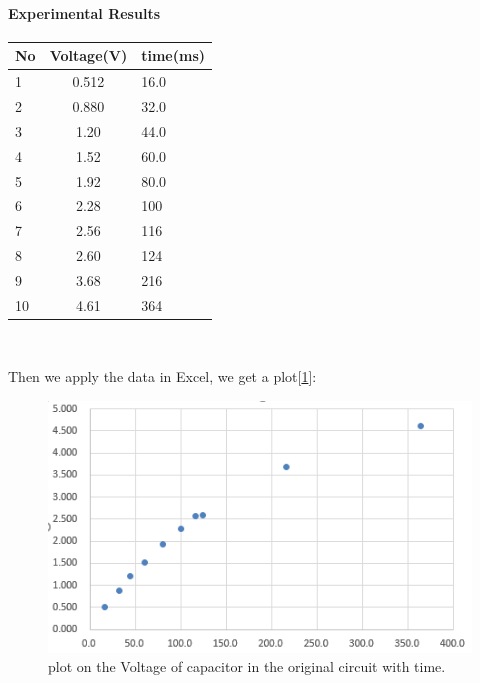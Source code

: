 \paragraph{Experimental Results}
\begin{table}[htbp]\centering
	\renewcommand\arraystretch{1.5}
	\begin{tabular}{lcl}
		\toprule
		No		&Voltage(V)	&time(ms)	\\
		\midrule
		1		&0.512		&16.0		\\
		
		2		&0.880		&32.0		\\
		
		3		&1.20		&44.0		\\
		
		4		&1.52		&60.0		\\
		
		5		&1.92		&80.0		\\
		
		6		&2.28		&100		\\
		
		7		&2.56		&116		\\
		
		8		&2.60		&124		\\
		
		9		&3.68		&216		\\
		
		10		&4.61		&364		\\
		\bottomrule
	\end{tabular}\\
\end{table}
\phantom{ } Then we apply the data in Excel, we get a plot[\ref{fig:2.1}]:\\
\begin{figure}[htbp]
	\centering %
	\includegraphics[width=\linewidth]{images/2_1.PNG} %
	\caption{plot on the Voltage of capacitor in the original circuit with time.} %
	\label{fig:2.1} %
\end{figure}\\
